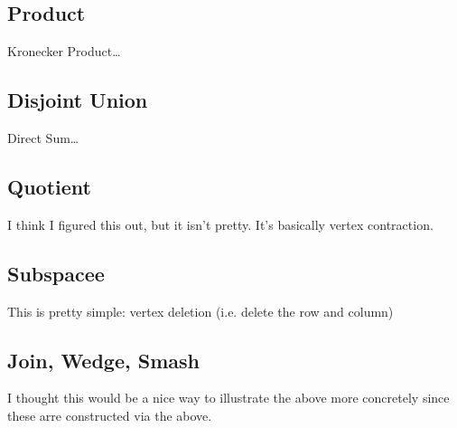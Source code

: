 \documentclass[paper=a4, fontsize=11pt]{scrartcl} %
\numberwithin{equation}{section} %
\numberwithin{figure}{section} %
\numberwithin{table}{section} %
\theoremstyle{definition}
\theoremstyle{remark}
\begin{document}
\subsection{Product}
Kronecker Product\dots
\subsection{Disjoint Union}
Direct Sum\dots
\subsection{Quotient}
I think I figured this out, but it isn't pretty. It's basically vertex contraction.
\subsection{Subspacee}
This is pretty simple: vertex deletion (i.e. delete the row and column)
\subsection{Join, Wedge, Smash}
I thought this would be a nice way to illustrate the above more concretely since these arre constructed via the above.

\end{document}
